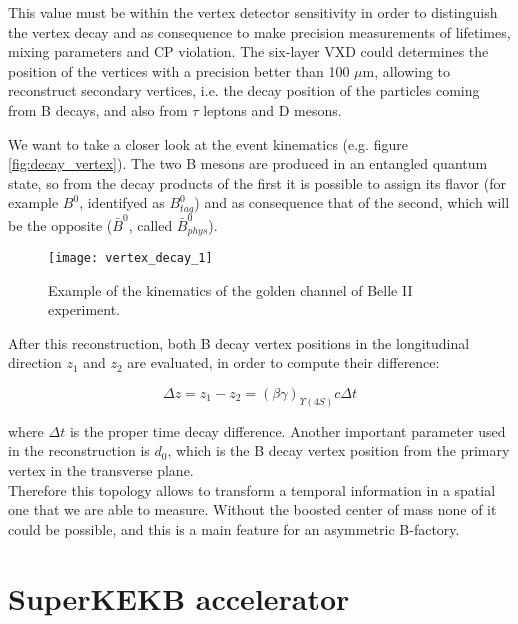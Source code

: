 This value must be within the vertex detector sensitivity in order to distinguish the vertex decay and as consequence to make precision measurements of lifetimes, mixing parameters and CP violation. The six-layer VXD could determines the position of the vertices with a precision better than 100 $\mu$m, allowing to reconstruct secondary vertices, i.e. the decay position of the particles coming from B decays, and also from $\tau$ leptons and D mesons.

We want to take a closer look at the event kinematics (e.g. figure \vref{fig:decay_vertex}). The two B mesons are produced in an entangled quantum state, so from the decay products of the first it is possible to assign its flavor (for example $B^{0}$, identifyed as $B_{tag}^{0}$) and as consequence that of the second, which will be the opposite ($\bar{B}^{0}$, called $\bar{B}_{phys}^{0}$).

\begin{figure}[h!]
\centering
\texttt{[image: vertex\_decay\_1]}
\caption{Example of the kinematics of the golden channel of Belle II experiment.}
\label{fig:decay_vertex}
\end{figure}

After this reconstruction, both B decay vertex positions in the longitudinal direction $\textit{z}_{1}$ and $\textit{z}_{2}$ are evaluated, in order to compute their difference:

\begin{equation}
\Delta \textit{z} = \textit{z}_{1} - \textit{z}_{2} = (\beta\gamma)_{\Upsilon(4S)}c\Delta t
\end{equation}

where $\Delta t$ is the proper time decay difference. 
Another important parameter used in the reconstruction is \textit{$d_{0}$}, which is the B decay vertex position from the primary vertex in the transverse plane.\\
Therefore this topology allows to transform a temporal information in a spatial one that we are able to measure. Without the boosted center of mass none of it could be possible, and this is a main feature for an asymmetric B-factory. 




\section{SuperKEKB accelerator}

